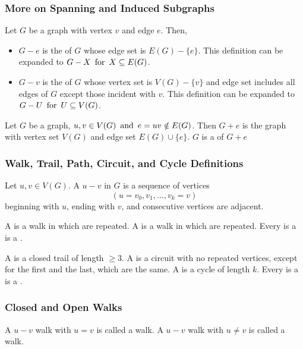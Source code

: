 \subsubsection*{More on Spanning and Induced Subgraphs}
Let $G$ be a graph with vertex $v$ and edge $e$. Then,
\begin{itemize}
    \item $G-e$ is the  of $G$ whose edge set is $E(G)-\{e\}$.
          \subitem This definition can be expanded to $G-X \operatorname{~\text{for}~} X \subseteq E(G)$.
    \item $G-v$ is the  of $G$ whose vertex set is $V(G) - \{v\}$ and edge set includes all edges of $G$ except those incident with $v$.
          \subitem This definition can be expanded to $G-U \operatorname{~\text{for}~} U \subseteq V(G)$.
\end{itemize}
Let $G$ be a graph, $u,v \in V(G) \operatorname{~\text{and}~} e = uv \notin E(G)$. Then $G+e$ is the graph with vertex set $V(G)$ and edge set $E(G) \cup \{e\}$. $G$ is a  of $G+e$

\subsubsection*{Walk, Trail, Path, Circuit, and Cycle Definitions}
Let $u,v \in V(G)$. A $u-v$  in $G$ is a sequence of vertices
\[
    (u = v_0, v_1, \ldots, v_k = v)
\]
beginning with $u$, ending with $v$, and consecutive vertices are adjacent.

A  is a walk in which  are repeated. A  is a walk in which  are repeated. Every  is a  is a .

A  is a closed trail of length $\ge 3$. A  is a circuit with no repeated vertices, except for the first and the last, which are the same. A  is a cycle of length $k$. Every  is a  is a .

\subsubsection*{Closed and Open Walks}
A $u-v$ walk with $u=v$ is called a  walk. A $u-v$ walk with $u \neq v$ is called a  walk.


